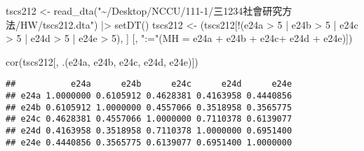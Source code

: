 \documentclass[
]{article}
\newenvironment{Shaded}{\begin{snugshade}}{\end{snugshade}}
\newcommand{\AttributeTok}[1]{\textcolor[rgb]{0.77,0.63,0.00}{#1}}
\newcommand{\DecValTok}[1]{\textcolor[rgb]{0.00,0.00,0.81}{#1}}
\newcommand{\FunctionTok}[1]{\textcolor[rgb]{0.00,0.00,0.00}{#1}}
\newcommand{\NormalTok}[1]{#1}
\newcommand{\OtherTok}[1]{\textcolor[rgb]{0.56,0.35,0.01}{#1}}
\newcommand{\SpecialCharTok}[1]{\textcolor[rgb]{0.00,0.00,0.00}{#1}}
\newcommand{\StringTok}[1]{\textcolor[rgb]{0.31,0.60,0.02}{#1}}
\begin{document}
\begin{Shaded}
\begin{Highlighting}[]
\NormalTok{tscs212 }\OtherTok{\textless{}{-}} \FunctionTok{read\_dta}\NormalTok{(}\StringTok{"\textasciitilde{}/Desktop/NCCU/111{-}1/三1234社會研究方法/HW/tscs212.dta"}\NormalTok{) }\SpecialCharTok{|\textgreater{}} \FunctionTok{setDT}\NormalTok{()}
\NormalTok{tscs212 }\OtherTok{\textless{}{-}}\NormalTok{ (tscs212[}\SpecialCharTok{!}\NormalTok{(e24a }\SpecialCharTok{\textgreater{}} \DecValTok{5} \SpecialCharTok{|}\NormalTok{ e24b }\SpecialCharTok{\textgreater{}} \DecValTok{5} \SpecialCharTok{|}\NormalTok{ e24c }\SpecialCharTok{\textgreater{}} \DecValTok{5} \SpecialCharTok{|}\NormalTok{ e24d }\SpecialCharTok{\textgreater{}}  \DecValTok{5} \SpecialCharTok{|}\NormalTok{ e24e }\SpecialCharTok{\textgreater{}} \DecValTok{5}\NormalTok{), ]}
\NormalTok{                   [, }\StringTok{":="}\NormalTok{(}\AttributeTok{MH =}\NormalTok{ e24a }\SpecialCharTok{+}\NormalTok{ e24b }\SpecialCharTok{+}\NormalTok{ e24c}\SpecialCharTok{+}\NormalTok{ e24d }\SpecialCharTok{+}\NormalTok{ e24e)])}

\FunctionTok{cor}\NormalTok{(tscs212[, .(e24a, e24b, e24c, e24d, e24e)])}
\end{Highlighting}
\end{Shaded}

\begin{verbatim}
##           e24a      e24b      e24c      e24d      e24e
## e24a 1.0000000 0.6105912 0.4628381 0.4163958 0.4440856
## e24b 0.6105912 1.0000000 0.4557066 0.3518958 0.3565775
## e24c 0.4628381 0.4557066 1.0000000 0.7110378 0.6139077
## e24d 0.4163958 0.3518958 0.7110378 1.0000000 0.6951400
## e24e 0.4440856 0.3565775 0.6139077 0.6951400 1.0000000
\end{verbatim}
\end{document}
